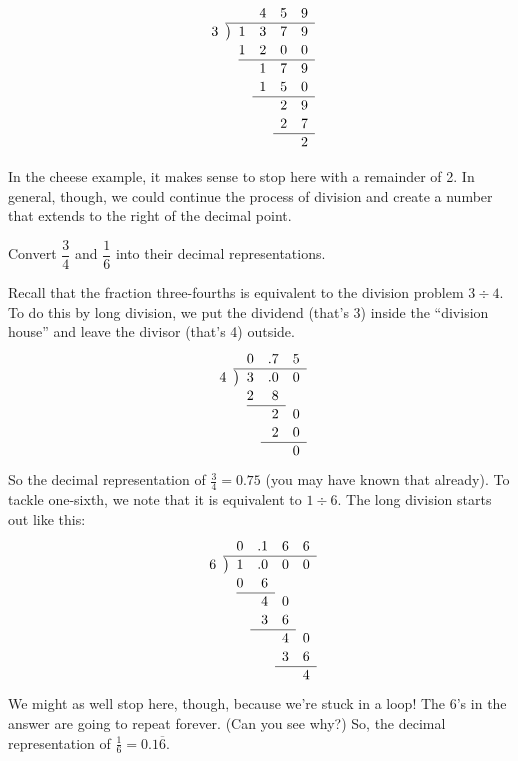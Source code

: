 \[
\renewcommand\arraystretch{1.1}
\begin{array}{*1r @{\hskip\arraycolsep}c@{\hskip\arraycolsep} *4r}
	&&			& 4	& 5 & 9\\
\cline{2-6}
3	&\big)&	1	& 3	& 7 & 9\\
	&&		1	& 2	& 0	& 0\\
\cline{3-6}
	&&			& 1	& 7 & 9\\
	&&			& 1	& 5	& 0\\
\cline{4-6}
	&&			& 	& 2	& 9\\
	&&			&	& 2	& 7\\
\cline{5-6}
	&&			& 	& 	& 2\\
\end{array}
\]

In the cheese example, it makes sense to stop here with a remainder of 2. In general, though, we could continue the process of division and create a number that extends to the right of the decimal point.

\begin{boxedex}
Convert $\dfrac{3}{4}$ and $\dfrac{1}{6}$ into their decimal representations.

\bigskip{} Recall that the fraction three-fourths is equivalent to the division problem $3 \div 4$. To do this by long division, we put the dividend (that's 3) inside the ``division house'' and leave the divisor (that's 4) outside.
\[
\renewcommand\arraystretch{1.1}
\begin{array}{*1r @{\hskip\arraycolsep}c@{\hskip\arraycolsep} *3r}
	&&			0& .7	& 5 \\
\cline{2-5}
4	&\big)&	3	& .0	& 0 \\
	&&		2	&8		\\
\cline{3-4}
	&&			&2 & 0 \\
	&&			&2 & 0 \\
\cline{4-5}
	&&			&& 0 \\
\end{array}
\]
So the decimal representation of $\frac{3}{4} = 0.75$ (you may have known that already). To tackle one-sixth, we note that it is equivalent to $1 \div 6$. The long division starts out like this:
\[
\renewcommand\arraystretch{1.1}
\begin{array}{*1r @{\hskip\arraycolsep}c@{\hskip\arraycolsep} *4r}
	&&			0& .1	& 6	& 6 \\
\cline{2-6}
6	&\big)&	1	& .0	& 0	& 0 \\
	&&		0	&6		\\
\cline{3-4}
	&&			&4	& 0 \\
	&&			&3	& 6 \\
\cline{4-5}
	&&			&	& 4	& 0 \\
	&&			&	& 3	& 6 \\
\cline{5-6}
	&&			&	&	& 4
\end{array}
\]
We might as well stop here, though, because we're stuck in a loop! The 6's in the answer are going to repeat forever. (Can you see why?) So, the decimal representation of $\frac{1}{6} = 0.1\overline{6}$.
\end{boxedex}

